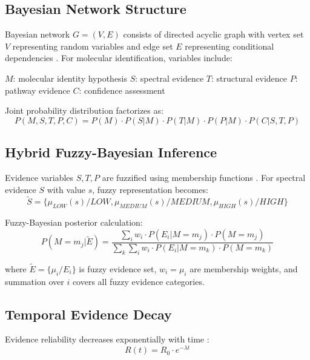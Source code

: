 \subsection{Bayesian Network Structure}

Bayesian network $G = (V, E)$ consists of directed acyclic graph with vertex set $V$ representing random variables and edge set $E$ representing conditional dependencies \cite{pearl1988probabilistic}. For molecular identification, variables include:

$M$: molecular identity hypothesis
$S$: spectral evidence
$T$: structural evidence  
$P$: pathway evidence
$C$: confidence assessment

Joint probability distribution factorizes as:
\begin{equation}
P(M, S, T, P, C) = P(M) \cdot P(S|M) \cdot P(T|M) \cdot P(P|M) \cdot P(C|S, T, P)
\end{equation}

\subsection{Hybrid Fuzzy-Bayesian Inference}

Evidence variables $S, T, P$ are fuzzified using membership functions \cite{mamdani1975experiment}. For spectral evidence $S$ with value $s$, fuzzy representation becomes:
\begin{equation}
\tilde{S} = \{\mu_{LOW}(s)/LOW, \mu_{MEDIUM}(s)/MEDIUM, \mu_{HIGH}(s)/HIGH\}
\end{equation}

Fuzzy-Bayesian posterior calculation:
\begin{equation}
P(M = m_j | \tilde{E}) = \frac{\sum_{i} w_i \cdot P(E_i | M = m_j) \cdot P(M = m_j)}{\sum_{k} \sum_{i} w_i \cdot P(E_i | M = m_k) \cdot P(M = m_k)}
\end{equation}

where $\tilde{E} = \{\mu_i/E_i\}$ is fuzzy evidence set, $w_i = \mu_i$ are membership weights, and summation over $i$ covers all fuzzy evidence categories.

\subsection{Temporal Evidence Decay}

Evidence reliability decreases exponentially with time \cite{norris1997markov}:
\begin{equation}
R(t) = R_0 \cdot e^{-\lambda t}
\end{equation}

